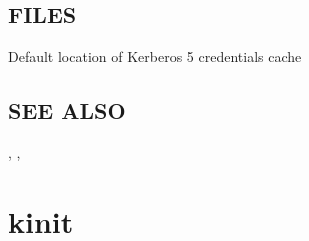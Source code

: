 \documentclass[letterpaper,10pt,english]{sphinxmanual}
\begin{document}
\subsection{FILES}
\label{\detokenize{user/user_commands/kdestroy:files}}\begin{description}
\sphinxAtStartPar
Default location of Kerberos 5 credentials cache

\end{description}


\subsection{SEE ALSO}
\label{\detokenize{user/user_commands/kdestroy:see-also}}
\sphinxAtStartPar
{\hyperref[\detokenize{user/user_commands/kinit:kinit-1}]{}}, {\hyperref[\detokenize{user/user_commands/klist:klist-1}]{}}, {\hyperref[\detokenize{user/user_config/kerberos:kerberos-7}]{}}

\sphinxstepscope


\section{kinit}
\label{\detokenize{user/user_commands/kinit:kinit}}\label{\detokenize{user/user_commands/kinit:kinit-1}}\label{\detokenize{user/user_commands/kinit::doc}}
\end{document}
